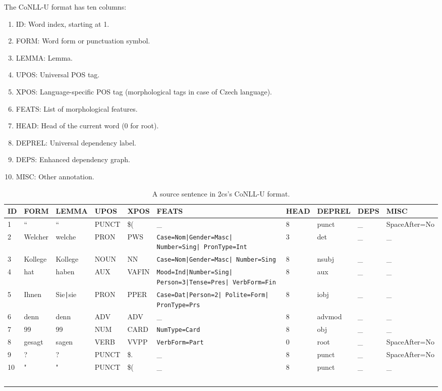The CoNLL-U format has ten columns:
\begin{enumerate}
    \item ID: Word index, starting at 1.
    \item FORM: Word form or punctuation symbol.
    \item LEMMA: Lemma.
    \item UPOS: Universal POS tag.
    \item XPOS: Language-specific POS tag (morphological tags in case of Czech language).
    \item FEATS: List of morphological features.
    \item HEAD: Head of the current word (0 for root).
    \item DEPREL: Universal dependency label.
    \item DEPS: Enhanced dependency graph.
    \item MISC: Other annotation.
\end{enumerate}

\begin{landscape}
    \begin{table}[t]
    \small
    \begin{center}
    \begin{tabular}{l|l|l|l|l|p{4.7cm}|l|l|l|l}
        \textbf{ID} & \textbf{FORM} & \textbf{LEMMA} & \textbf{UPOS} & \textbf{XPOS} & \textbf{FEATS} & \textbf{HEAD} & \textbf{DEPREL} & \textbf{DEPS} & \textbf{MISC} \\
     \hline
     1 & `` & `` & PUNCT & \$( & \_ & 8 & punct & \_ & SpaceAfter=No \\
     2 & Welcher & welche & PRON & PWS & \texttt{Case=Nom|Gender=Masc| Number=Sing| PronType=Int} & 3 & det & \_ & \_ \\
     3 & Kollege & Kollege & NOUN & NN & \texttt{Case=Nom|Gender=Masc| Number=Sing} & 8 & nsubj & \_ & \_ \\
     4 & hat & haben & AUX & VAFIN & \texttt{Mood=Ind|Number=Sing| Person=3|Tense=Pres| VerbForm=Fin} & 8 & aux & \_ & \_ \\
     5 & Ihnen & Sie\texttt{|}sie & PRON & PPER & \texttt{Case=Dat|Person=2| Polite=Form| PronType=Prs} & 8 & iobj & \_ & \_ \\
     6 & denn & denn & ADV & ADV & \_ & 8 & advmod & \_ & \_ \\
     7 & 99 & 99 & NUM & CARD & \texttt{NumType=Card} & 8 & obj & \_ & \_ \\
     8 & gesagt & sagen & VERB & VVPP & \texttt{VerbForm=Part} & 0 & root & \_ & SpaceAfter=No \\
     9 & ? & ? & PUNCT & \$. & \_ & 8 & punct & \_ & SpaceAfter=No \\
     10 & " & " & PUNCT & \$( & \_ & 8 & punct & \_ & \_ \\\
    \end{tabular}
    \end{center}
    \caption{A source sentence in \de2cs's CoNLL-U format.}
    \label{tab:data-decs}
    \end{table}
\end{landscape}

